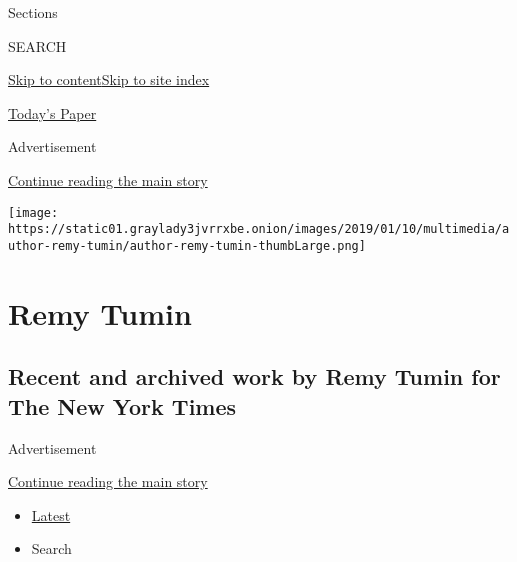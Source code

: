Sections

SEARCH

\protect\hyperlink{site-content}{Skip to
content}\protect\hyperlink{site-index}{Skip to site index}

\href{https://myaccount.nytimes3xbfgragh.onion/auth/login?response_type=cookie\&client_id=vi}{}

\href{https://www.nytimes3xbfgragh.onion/section/todayspaper}{Today's
Paper}

Advertisement

\protect\hyperlink{after-top}{Continue reading the main story}

\texttt{[image: https://static01.graylady3jvrrxbe.onion/images/2019/01/10/multimedia/author-remy-tumin/author-remy-tumin-thumbLarge.png]}

\hypertarget{remy-tumin}{%
\section{Remy Tumin}\label{remy-tumin}}

\hypertarget{recent-and-archived-work-by-remy-tumin-for-the-new-york-times}{%
\subsection{Recent and archived work by Remy Tumin for The New York
Times}\label{recent-and-archived-work-by-remy-tumin-for-the-new-york-times}}

Advertisement

\protect\hyperlink{after-mid1}{Continue reading the main story}

\begin{itemize}
\tightlist
\item
  \protect\hyperlink{stream-panel}{Latest}
\item
  Search
\end{itemize}


